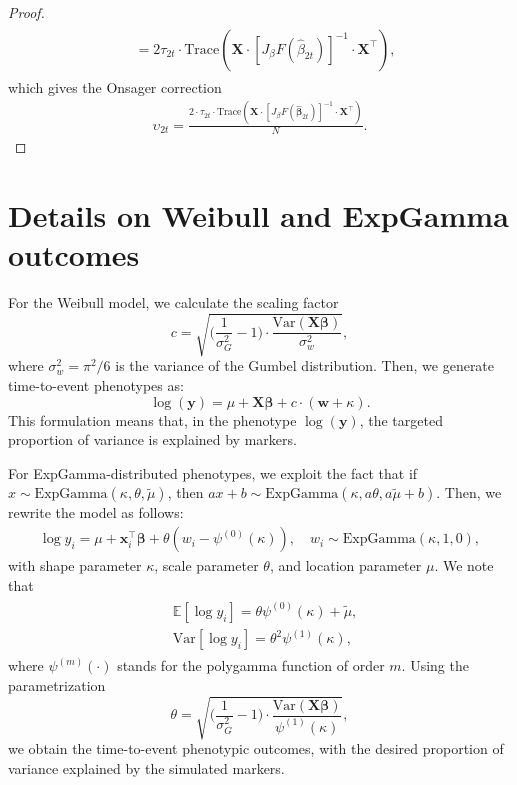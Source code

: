 \begin{proof}
\begin{align}
\begin{split}
        & = 2 \tau_{2t} \cdot \text{Trace}(\bm{X} \cdot [J_{\beta}F(\hat{\beta}_{2t})]^{-1} \cdot \bm{X}^\top),
        \end{split}
    \end{align}
    which gives the Onsager correction %
    \begin{align}
        \upsilon_{2t} = \frac{2 \cdot \tau_{2t} \cdot \text{Trace}(\bm{X} \cdot [J_{\beta}F(\hat{\bm{\beta}}_{2t})]^{-1} \cdot \bm{X}^\top)}{N}.
    \end{align}
    \end{proof}

\clearpage

\section{Details on Weibull and ExpGamma outcomes} \label{sec:sup4}

For the Weibull model, %
we calculate the scaling factor 
\begin{equation}
    c = \sqrt{\bigg (\frac{1}{\sigma^2_G} - 1 \bigg ) \cdot \frac{\text{Var}(\bm{X}\bm{\beta})}{\sigma^2_{w}}},
\end{equation}
where $\sigma^2_w=\pi^2/6$ is the variance of the Gumbel distribution. Then, we generate time-to-event phenotypes as:
\begin{equation}
    \log({\bm{y}}) = \mu + \bm{X}\bm{\beta} + c \cdot (\bm{w} + \kappa).
\end{equation}
This formulation means that, in the phenotype $\log(\bm{y})$, the targeted proportion of variance is explained by markers.

For ExpGamma-distributed phenotypes, we exploit the fact that if $x \sim \text{ExpGamma}(\kappa, \theta, \tilde{\mu})$, then $ax + b \sim \text{ExpGamma}(\kappa, a \theta, a \tilde{\mu} + b)$. Then, we rewrite the model as follows:
\begin{align}
    \log y_i = \mu + \bm{x}_i^\top \bm{\beta} + \theta(w_i - \psi^{(0)}(\kappa)), \quad w_i \sim \text{ExpGamma}(\kappa, 1, 0),
\end{align}
with shape parameter $\kappa$, scale parameter $\theta$, and location parameter $\mu$.  We note that
\begin{align}
    \begin{split}
    & \mathbb{E}[\log y_i] = \theta  \psi ^{(0)}(\kappa )+ \tilde{\mu}, \\
    & 
    \text{Var}[\log y_i] = \theta ^2 \psi ^{(1)}(\kappa ),
    \end{split}
\end{align} where $\psi^{(m)}(\cdot)$ stands for the polygamma function of order $m$. Using the parametrization
\begin{equation}
    \theta = \sqrt{\bigg (\frac{1}{\sigma^2_G} - 1 \bigg ) \cdot \frac{\text{Var}(\bm{X\beta}) }{ \psi^{(1)}(\kappa)}},
\end{equation}
we obtain the time-to-event phenotypic outcomes, with the desired proportion of variance explained by the simulated markers.

\clearpage
